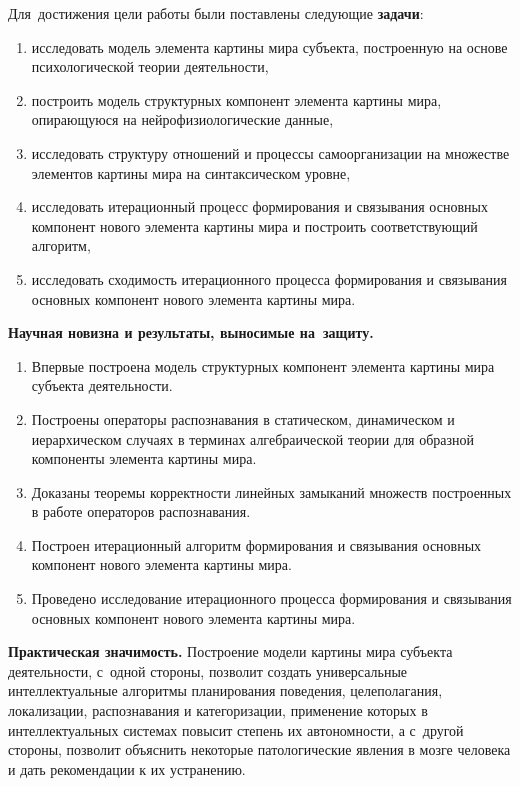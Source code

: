 Для~достижения цели работы были поставлены следующие \textbf{задачи}:
\begin{enumerate}
  \item исследовать модель элемента картины мира субъекта, построенную на основе психологической теории деятельности,
  \item построить модель структурных компонент элемента картины мира, опирающуюся на нейрофизиологические данные,
  \item исследовать структуру отношений и процессы самоорганизации на множестве элементов картины мира на синтаксическом уровне,
  \item исследовать итерационный процесс формирования и связывания основных компонент нового элемента картины мира и построить соответствующий алгоритм,
  \item исследовать сходимость итерационного процесса формирования и связывания основных компонент нового элемента картины мира.
\end{enumerate}

\textbf{Научная новизна и результаты, выносимые на~защиту.}
\begin{enumerate}
	\renewcommand\labelenumi{\theenumi.}
  \item Впервые построена модель структурных компонент элемента картины мира субъекта деятельности.
  \item Построены операторы распознавания в статическом, динамическом и иерархическом случаях в терминах алгебраической теории для образной компоненты элемента картины мира.
  \item Доказаны теоремы корректности линейных замыканий множеств построенных в работе операторов распознавания.
  \item Построен итерационный алгоритм формирования и связывания основных компонент нового элемента картины мира.
  \item Проведено исследование итерационного процесса формирования и связывания основных компонент нового элемента картины мира.
\end{enumerate}

\textbf{Практическая значимость.} Построение модели картины мира субъекта деятельности, с~одной стороны, позволит создать универсальные интеллектуальные алгоритмы планирования поведения, целеполагания, локализации, распознавания и категоризации, применение которых в интеллектуальных системах повысит степень их автономности, а с~другой стороны, позволит объяснить некоторые патологические явления в мозге человека и дать рекомендации к их устранению.

